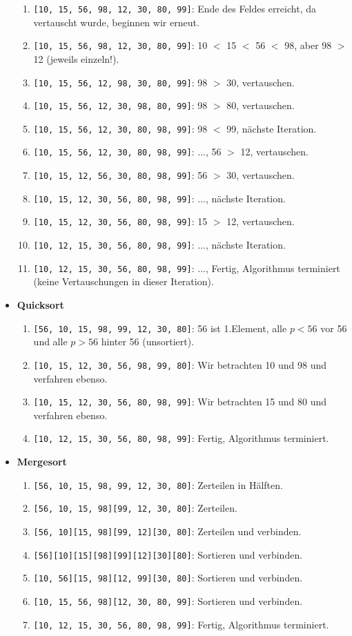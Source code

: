 \documentclass[11pt,a4paper]{scrartcl}
\begin{document}
\begin{itemize}
\begin{enumerate}
\item \texttt{[10, 15, 56, 98, 12, 30, 80, 99]}: Ende des Feldes erreicht, da vertauscht wurde, beginnen wir erneut.
\item \texttt{[10, 15, 56, 98, 12, 30, 80, 99]}: 10 $<$ 15 $<$ 56 $<$ 98, aber 98 $>$ 12 (jeweils einzeln!).
\item \texttt{[10, 15, 56, 12, 98, 30, 80, 99]}: 98 $>$ 30, vertauschen.
\item \texttt{[10, 15, 56, 12, 30, 98, 80, 99]}: 98 $>$ 80, vertauschen.
\item \texttt{[10, 15, 56, 12, 30, 80, 98, 99]}: 98 $<$ 99, nächste Iteration.
\item \texttt{[10, 15, 56, 12, 30, 80, 98, 99]}: ..., 56 $>$ 12, vertauschen.
\item \texttt{[10, 15, 12, 56, 30, 80, 98, 99]}: 56 $>$ 30, vertauschen.
\item \texttt{[10, 15, 12, 30, 56, 80, 98, 99]}: ..., nächste Iteration.
\item \texttt{[10, 15, 12, 30, 56, 80, 98, 99]}: 15 $>$ 12, vertauschen.
\item \texttt{[10, 12, 15, 30, 56, 80, 98, 99]}: ..., nächste Iteration.
\item \texttt{[10, 12, 15, 30, 56, 80, 98, 99]}: ..., Fertig, Algorithmus terminiert (keine Vertauschungen in dieser Iteration).
\end{enumerate}
\item \textbf{Quicksort}
\begin{enumerate}
\item \texttt{[56, 10, 15, 98, 99, 12, 30, 80]}: 56 ist 1.Element, alle $p < 56$ vor 56 und alle $p > 56$ hinter 56 (unsortiert).
\item \texttt{[10, 15, 12, 30, 56, 98, 99, 80]}: Wir betrachten 10 und 98 und verfahren ebenso.
\item \texttt{[10, 15, 12, 30, 56, 80, 98, 99]}: Wir betrachten 15 und 80 und verfahren ebenso.
\item \texttt{[10, 12, 15, 30, 56, 80, 98, 99]}: Fertig, Algorithmus terminiert.
\end{enumerate}
\item \textbf{Mergesort}
\begin{enumerate}
\item \texttt{[56, 10, 15, 98, 99, 12, 30, 80]}: Zerteilen in Hälften.
\item \texttt{[56, 10, 15, 98][99, 12, 30, 80]}: Zerteilen.
\item \texttt{[56, 10][15, 98][99, 12][30, 80]}: Zerteilen und verbinden.
\item \texttt{[56][10][15][98][99][12][30][80]}: Sortieren und verbinden.
\item \texttt{[10, 56][15, 98][12, 99][30, 80]}: Sortieren und verbinden.
\item \texttt{[10, 15, 56, 98][12, 30, 80, 99]}: Sortieren und verbinden.
\item \texttt{[10, 12, 15, 30, 56, 80, 98, 99]}: Fertig, Algorithmus terminiert.
\end{enumerate}
\end{itemize}
\end{document}
